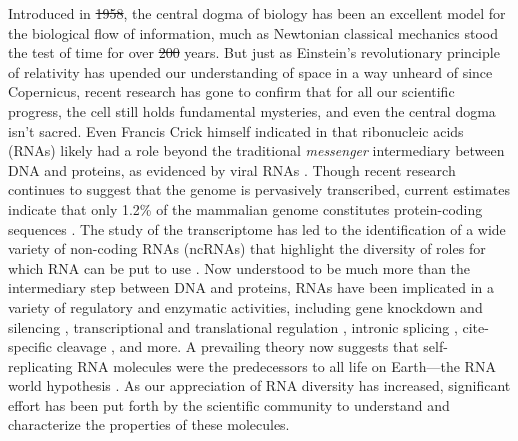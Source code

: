 \documentclass[11pt, oneside]{Thesis} %
\providecommand{\DIFadd}[1]{{\protect\color{blue}\uwave{#1}}} %
\providecommand{\DIFdel}[1]{{\protect\color{red}\sout{#1}}}                      %
\providecommand{\DIFaddbegin}{} %
\providecommand{\DIFaddend}{} %
\providecommand{\DIFdelbegin}{} %
\providecommand{\DIFdelend}{} %
\begin{document}
Introduced in \DIFdelbegin \DIFdel{1958}\DIFdelend \DIFaddbegin \DIFadd{$1958$}\DIFaddend , the central dogma of biology has been an excellent model for
the biological flow of information, much as Newtonian classical mechanics stood the
test of time for over \DIFdelbegin \DIFdel{200 }\DIFdelend \DIFaddbegin \DIFadd{$200$ }\DIFaddend years. But just as Einstein’s revolutionary principle of
relativity has upended our understanding of space in a way unheard of since
Copernicus, recent research has gone to confirm that for all our scientific
progress, the cell still holds fundamental mysteries, and even the central dogma
isn't sacred. Even Francis Crick himself indicated in \citep{crick:1970wb} that
ribonucleic acids (RNAs) likely had a role beyond the traditional {\em messenger}
intermediary between
DNA and proteins, as evidenced by viral RNAs \citep{coffin:1997ws}. Though recent
research continues to suggest that the genome is pervasively transcribed, current
estimates indicate that only 1.2\% of the mammalian genome constitutes
protein-coding sequences \citep{berretta:2009tq,clark:2011cc,jensen:2013vb}. The
study of the transcriptome has led to the identification of a wide variety of
non-coding RNAs (ncRNAs) that highlight the diversity of roles for which RNA can
be put to use \citep{costa:2005ug}. Now understood to be much more than the
intermediary step between DNA and proteins, RNAs have been implicated in a variety
of regulatory and enzymatic activities, including gene knockdown and silencing
\citep{fire:1998tv,mccaffrey:2002tf,hannon:2002vn,he:2004uk},
transcriptional and translational regulation \citep{nudler:2004vm,mandal:2004vh},
intronic splicing \citep{kruger:1982wk,cech:1990tn}, cite-specific cleavage
\citep{doherty:2001wq}, and more.
A prevailing theory now suggests that self-replicating RNA molecules were the
predecessors to all life on Earth---the RNA world hypothesis \citep{gilbert:1986td}.
As our appreciation of RNA diversity has increased,
significant effort has been put forth by the scientific community to understand
and characterize the properties of these molecules.
\end{document}
